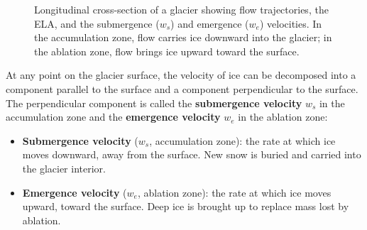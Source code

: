 \documentclass[11pt]{article}
\begin{document}
\begin{figure}[ht]
\caption{Longitudinal cross-section of a glacier showing flow trajectories, the ELA, and the submergence ($w_s$) and emergence ($w_e$) velocities.  In the accumulation zone, flow carries ice downward into the glacier; in the ablation zone, flow brings ice upward toward the surface.}
\label{fig:submergence}
\end{figure}

At any point on the glacier surface, the velocity of ice can be decomposed into a component parallel to the surface and a component perpendicular to the surface.  The perpendicular component is called the \textbf{submergence velocity} $w_s$ in the accumulation zone and the \textbf{emergence velocity} $w_e$ in the ablation zone:
\begin{itemize}
  \item \textbf{Submergence velocity} ($w_s$, accumulation zone): the rate at which ice moves downward, away from the surface.  New snow is buried and carried into the glacier interior.
  \item \textbf{Emergence velocity} ($w_e$, ablation zone): the rate at which ice moves upward, toward the surface.  Deep ice is brought up to replace mass lost by ablation.
\end{itemize}
\end{document}

